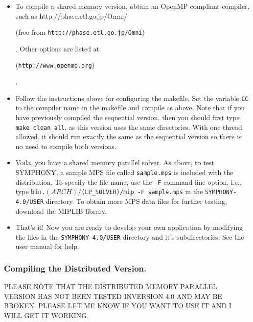 \begin{itemize}
        \item To compile a shared memory version, obtain an OpenMP
        compliant compiler, such as 
        {http://phase.etl.go.jp/Omni/}
\begin{latexonly} 
        (free from {\tt http://phase.etl.go.jp/Omni})
\end{latexonly}. 
        Other options are listed at 
\begin{latexonly}
        ({\tt http://www.openmp.org})
\end{latexonly}.

        \item Follow the instructions above for configuring the makefile. Set
the variable {\tt CC} to the compiler name in the makefile and compile as
above. Note that if you have previously compiled the sequential version, then
you should first type {\tt make clean\_all}, as this version uses the same
directories.  With one thread allowed, it should run exactly the same as the
sequential version so there is no need to compile both versions.

        \item Voila, you have a shared memory parallel solver. As above, to
test SYMPHONY, a sample MPS file called \texttt{sample.mps} is included with the
distribution. To specify the file name, use the \texttt{-F} command-line option,
i.e., type \texttt{bin.$(ARCH)/$(LP\_SOLVER)/mip -F sample.mps} in the
\texttt{SYMPHONY-4.0/USER} directory. To obtain more MPS data files for further
testing, download the MIPLIB library.

\item That's it! Now you are ready to develop your own application by modifying
the files in the \texttt{SYMPHONY-4.0/USER} directory and it's
subdirectories. See the user manual for help.

\end{itemize}

\subsubsection{Compiling the Distributed Version.}

PLEASE NOTE THAT THE DISTRIBUTED MEMORY PARALLEL VERSION HAS NOT BEEN TESTED
INVERSION 4.0 AND MAY BE BROKEN. PLEASE LET ME KNOW IF YOU WANT TO USE IT AND
I WILL GET IT WORKING.

